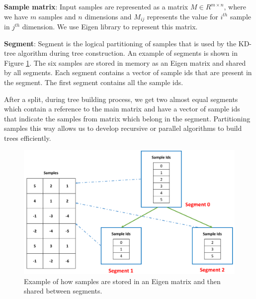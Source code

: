 \documentclass[11pt]{amsart}
\begin{document}
\begin{list}{}{\leftmargin= 1.4cm} \setlength\itemsep{1em}

\item \textbf{Sample matrix}: Input samples are represented as a matrix $M \in R^{m \times n}$, where we have $m$ samples and $n$ dimensions and $M_{ij}$ represents the value for $i^{th}$ sample in $j^{th}$ dimension. We use Eigen library \cite{Guennebaud:2010aa} to represent this matrix.

\item \textbf{Segment}: Segment is the logical partitioning of samples that is used by the KD-tree algorithm during tree construction. An example of segments is shown in Figure \ref{fig:segment}. The six samples are stored in memory as an Eigen matrix and shared by all segments. Each segment contains a vector of sample ids that are present in the segment. The first segment contains all the sample ids. 

After a split, during tree building process, we get two almost equal segments which contain a reference to the main matrix and have a vector of sample ids that indicate the samples from matrix which belong in the segment. Partitioning samples this way allows us to develop recursive or parallel algorithms to build trees efficiently. 

\begin{figure}[t!]
\centering
\includegraphics[width=\linewidth]{images/segment}
\caption{Example of how samples are stored in an Eigen matrix and then shared between segments.}
\label{fig:segment}
\end{figure}


\end{list}
\end{document}
